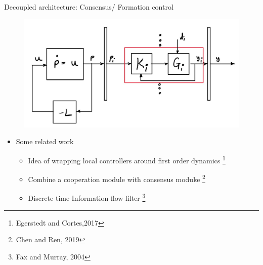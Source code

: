 \begin{frame}{Decoupled architecture: Consensus/ Formation control}
	\begin{figure}
		\includegraphics[scale=0.35]{figures/decoupled_consensus.JPG}	
		\label{fig:Coupled}
	\end{figure}
	\begin{itemize}
		\item Some related work
		\begin{itemize}
			\item Idea of wrapping local controllers around first order dynamics \footnote{Egerstedt and Cortes,2017}
			\item Combine a cooperation module with consensus moduke \footnote{Chen and Ren, 2019}
			\item Discrete-time Information flow filter \footnote{Fax and Murray, 2004}
		\end{itemize}
	\end{itemize}
\end{frame}
